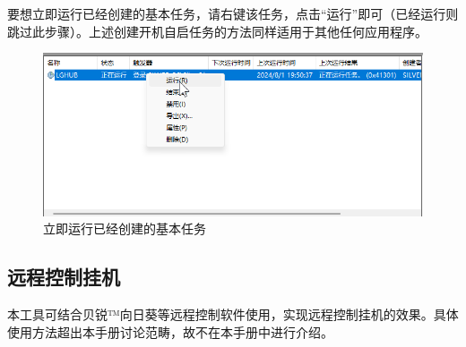 要想立即运行已经创建的基本任务，请右键该任务，点击“运行”即可（已经运行则跳过此步骤）。上述创建开机自启任务的方法同样适用于其他任何应用程序。

\begin{figure}[H]
    \Centering
    \includegraphics[width=\textwidth]{assets/skills/run_task.png}
    \caption{立即运行已经创建的基本任务}
\end{figure}

\subsection{远程控制挂机}

本工具可结合贝锐™向日葵等远程控制软件使用，实现远程控制挂机的效果。具体使用方法超出本手册讨论范畴，故不在本手册中进行介绍。